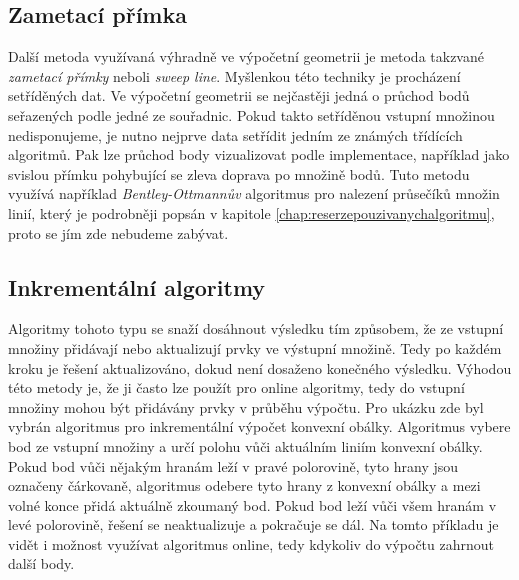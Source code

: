 \subsection{Zametací přímka}
	Další metoda využívaná výhradně ve výpočetní geometrii je metoda takzvané \textit{zametací přímky} neboli \textit{sweep line}. Myšlenkou této techniky je procházení setříděných dat. Ve výpočetní geometrii se nejčastěji jedná o průchod bodů seřazených podle jedné ze souřadnic. Pokud takto setříděnou vstupní množinou nedisponujeme, je nutno nejprve data setřídit jedním ze známých třídících algoritmů. Pak lze průchod body vizualizovat podle implementace, například jako svislou přímku pohybující se zleva doprava po množině bodů.
	Tuto metodu využívá například \textit{Bentley-Ottmannův} algoritmus pro nalezení průsečíků množin linií, který je podrobněji popsán v kapitole \ref{chap:reserzepouzivanychalgoritmu}, proto se jím zde nebudeme zabývat.

\subsection{Inkrementální algoritmy}
	Algoritmy tohoto typu se snaží dosáhnout výsledku tím způsobem, že ze vstupní množiny přidávají nebo aktualizují prvky ve výstupní množině. Tedy po každém kroku je řešení aktualizováno, dokud není dosaženo konečného výsledku. Výhodou této metody je, že ji často lze použít pro online algoritmy, tedy do vstupní množiny mohou být přidávány prvky v průběhu výpočtu.
	Pro ukázku zde byl vybrán algoritmus pro inkrementální výpočet konvexní obálky. Algoritmus vybere bod ze vstupní množiny a určí polohu vůči aktuálním liniím konvexní obálky. Pokud bod vůči nějakým hranám leží v pravé polorovině, tyto hrany jsou označeny čárkovaně, algoritmus odebere tyto hrany z konvexní obálky a mezi volné konce přidá aktuálně zkoumaný bod. Pokud bod leží vůči všem hranám v levé polorovině, řešení se neaktualizuje a pokračuje se dál. Na tomto příkladu je vidět i možnost využívat algoritmus online, tedy kdykoliv do výpočtu zahrnout další body.

